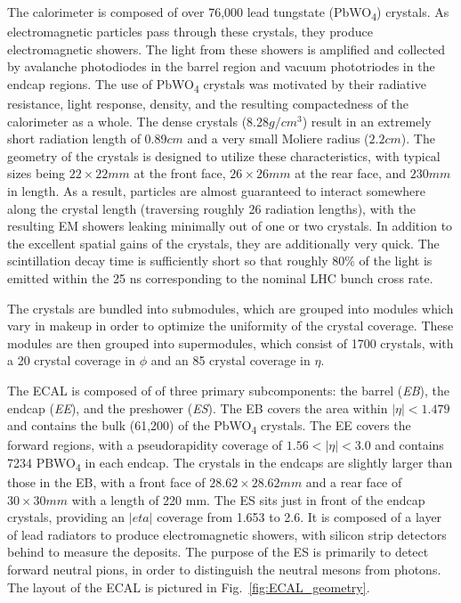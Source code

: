 The calorimeter is composed of over 76,000 lead tungstate (PbWO\textsubscript{4})
crystals. As electromagnetic particles pass through these crystals, they produce
electromagnetic showers. The light from these showers is amplified and collected
by avalanche photodiodes in the barrel region and vacuum phototriodes in the
endcap regions. The use of PbWO\textsubscript{4} crystals was motivated by
their radiative resistance, light response, density, and the resulting
compactedness of the calorimeter as a whole.  The dense crystals ($8.28 g/cm^3$)
result in an extremely short radiation length of 0.89$cm$ and a very small
Moliere radius ($2.2 cm$). The geometry of the crystals is designed to utilize
these characteristics, with typical sizes being $22\times22 mm$ at the front
face, $26\times26 mm$ at the rear face, and $230 mm$ in length. As a result,
particles are almost guaranteed to interact somewhere along the crystal length
(traversing roughly 26 radiation lengths), with the resulting EM showers leaking
minimally out of one or two crystals. In addition to the excellent spatial gains of the
crystals, they are additionally very quick. The scintillation decay time is
sufficiently short so that roughly 80\% of the light is emitted within the 25 ns
corresponding to the nominal LHC bunch cross rate. 

The crystals are bundled into submodules, which are grouped into modules which
vary in makeup in order to optimize the uniformity of the crystal coverage.
These modules are then grouped into supermodules, which consist of 1700
crystals, with a 20 crystal coverage in $\phi$ and an 85 crystal coverage in
$\eta$.

The ECAL is composed of of three primary subcomponents: the barrel (\emph{EB}),
the endcap (\emph{EE}), and the preshower (\emph{ES}). The EB covers the area
within $|\eta|<1.479$ and contains the bulk (61,200) of the PbWO\textsubscript{4}
crystals. The EE covers the forward regions, with a pseudorapidity coverage of
$1.56 < |\eta| < 3.0$ and contains 7234 PBWO\textsubscript{4} in each endcap.
The crystals in the endcaps are slightly larger than those in the EB, with a
front face of $28.62\times28.62 mm$ and a rear face of $30 \times 30 mm$ with a
length of 220 mm. The ES sits just in front of the endcap crystals, providing an
$|eta|$ coverage from 1.653 to 2.6. It is composed of
a layer of lead radiators to produce electromagnetic showers, with silicon strip
detectors behind to measure the deposits. The purpose of the ES is primarily to
detect forward neutral pions, in order to distinguish the neutral mesons from
photons. The layout of the ECAL is pictured in Fig.~\ref{fig:ECAL_geometry}.

